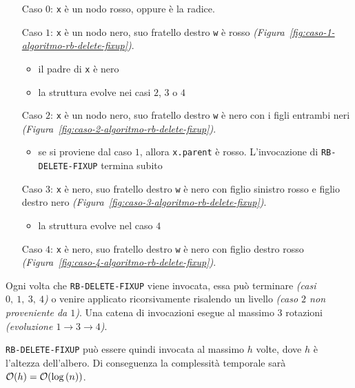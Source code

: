 \documentclass[italian, 10pt]{article}
\begin{document}
\begin{itemize}
  \item[Caso \(0\):] \texttt{x} è un nodo rosso, oppure è la radice.
  \item[Caso \(1\):] \texttt{x} è un nodo nero, suo fratello destro \texttt{w} è rosso \textit{(Figura~\ref{fig:caso-1-algoritmo-rb-delete-fixup})}.
  \begin{itemize}
    \item il padre di \texttt{x} è nero
    \item la struttura evolve nei casi \(2\), \(3\) o \(4\)
  \end{itemize}
\item[Caso \(2\):] \texttt{x} è un nodo nero, suo fratello destro \texttt{w} è nero con i figli entrambi neri \textit{(Figura~\ref{fig:caso-2-algoritmo-rb-delete-fixup})}.
\begin{itemize}
  \item se si proviene dal caso \(1\), allora \texttt{x.parent} è rosso. L'invocazione di \texttt{RB-DELETE-FIXUP} termina subito
\end{itemize}
\item[Caso \(3\):] \texttt{x} è nero, suo fratello destro \texttt{w} è nero con figlio sinistro rosso e figlio destro nero \textit{(Figura~\ref{fig:caso-3-algoritmo-rb-delete-fixup})}.
\begin{itemize}
  \item la struttura evolve nel caso \(4\)
\end{itemize}
\item[Caso \(4\):] \texttt{x} è nero, suo fratello destro \texttt{w} è nero con figlio destro rosso \textit{(Figura~\ref{fig:caso-4-algoritmo-rb-delete-fixup})}.
\end{itemize}

Ogni volta che \texttt{RB-DELETE-FIXUP} viene invocata, essa può terminare \textit{(casi \(0,\ 1,\ 3,\ 4\))} o venire applicato ricorsivamente risalendo un livello \textit{(caso \(2\) non proveniente da \(1\))}.
Una catena di invocazioni esegue al massimo \(3\) rotazioni \textit{(evoluzione \(1 \rightarrow 3 \rightarrow 4\))}.

\texttt{RB-DELETE-FIXUP} può essere quindi invocata al massimo \(h\) volte, dove \(h\) è l'altezza dell'albero.
Di conseguenza la complessità temporale sarà \(\mathcal{O}(h) = \mathcal{O}(\log{(n)})\).
\end{document}
